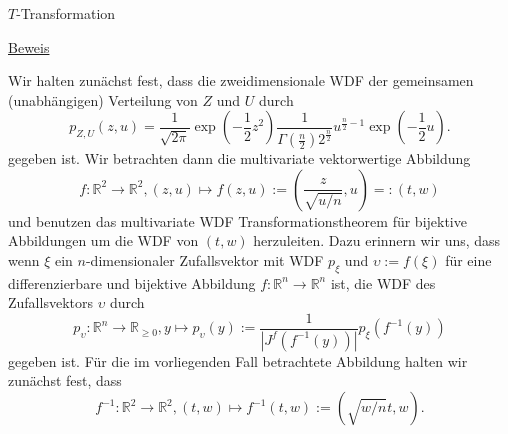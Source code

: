 \documentclass[
  8pt,
  ignorenonframetext,
]{beamer}
\newcommand{\ups}{\upsilon}
\begin{document}
\begin{frame}{\(T\)-Transformation}
\protect\hypertarget{t-transformation-4}{}
\footnotesize

\underline{Beweis} \vspace{1mm}

Wir halten zunächst fest, dass die zweidimensionale WDF der gemeinsamen
(unabhängigen) Verteilung von \(Z\) und \(U\) durch \begin{equation}
p_{Z,U}(z,u)
=
\frac{1}{\sqrt{2\pi}}\exp\left(-\frac{1}{2}z^2\right)
\frac{1}{\Gamma(\frac{n}{2})2^{\frac{n}{2}}}u^{\frac{n}{2}-1} \exp\left(-\frac{1}{2}u\right).
\end{equation} gegeben ist. Wir betrachten dann die multivariate
vektorwertige Abbildung \begin{equation}
f : \mathbb{R}^2 \to \mathbb{R}^2,
(z,u)
\mapsto
f(z,u)
:=
\left(\frac{z}{\sqrt{u/n}},u\right)
=:
(t,w)
\end{equation} und benutzen das multivariate WDF Transformationstheorem
für bijektive Abbildungen um die WDF von \((t,w)\) herzuleiten. Dazu
erinnern wir uns, dass wenn \(\xi\) ein \(n\)-dimensionaler
Zufallsvektor mit WDF \(p_\xi\) und \(\ups := f(\xi)\) für eine
differenzierbare und bijektive Abbildung
\(f : \mathbb{R}^n \to \mathbb{R}^n\) ist, die WDF des Zufallsvektors
\(\ups\) durch \begin{equation}\label{eq:pdftmv}
p_\ups : \mathbb{R}^n \to \mathbb{R}_{\ge 0},
y \mapsto p_\ups(y) :=
\frac{1}{|J^f\left(f^{-1}(y)\right)|}p_\xi\left(f^{-1}(y)\right)
\end{equation} gegeben ist. Für die im vorliegenden Fall betrachtete
Abbildung halten wir zunächst fest, dass \begin{equation}
f^{-1}:\mathbb{R}^2 \to \mathbb{R}^2,
(t,w)
\mapsto
f^{-1}
(t,w)
:=\left(\sqrt{w/n}t, w\right).
\end{equation}
\end{frame}
\end{document}
